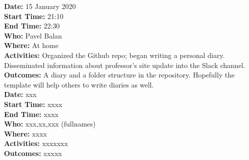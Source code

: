 \documentclass[12pt]{article}
\begin{document}
{\bf Date:} 15 January 2020\\
{\bf Start Time:} 21:10\\
{\bf End Time:} 22:30 \\
{\bf Who:} Pavel Balan\\
{\bf Where:} At home \\
{\bf Activities:} Organized the Github repo; began writing a personal diary. Disseminated information about professor's site update into the Slack channel.\\
{\bf Outcomes:} A diary and a folder structure in the repository. Hopefully the template will help others to write diaries as well.\\

{\bf Date:} xxx\\
{\bf Start Time:} xxxx\\
{\bf End Time:} xxxx \\
{\bf Who:} xxx,xx,xxx (fullnames)\\
{\bf Where:} xxxx \\
{\bf Activities:} xxxxxxx\\
{\bf Outcomes:} xxxxx\\


\end{document}
